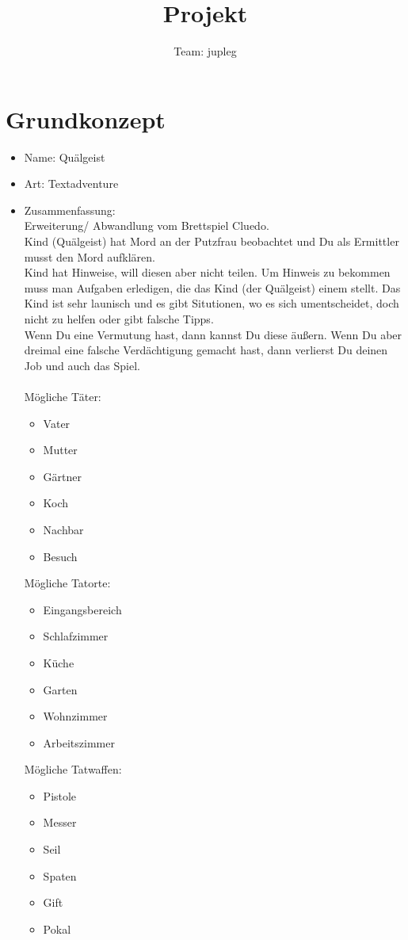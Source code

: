 \documentclass[10pt,a4paper]{article}
\title{Projekt}
\author{Team: jupleg}
\begin{document}
\maketitle
\newcommand{\thetitle} {Projekt}

\section*{Grundkonzept}
\begin{itemize}
\item Name: Quälgeist
\item Art: Textadventure
\item Zusammenfassung:\\
Erweiterung/ Abwandlung vom Brettspiel Cluedo.\\
Kind (Quälgeist) hat Mord an der Putzfrau beobachtet und Du als Ermittler musst den Mord aufklären.\\
Kind hat Hinweise, will diesen aber nicht teilen. Um Hinweis zu bekommen muss man Aufgaben erledigen, die das Kind (der Quälgeist) einem stellt. Das Kind ist sehr launisch und es gibt Situtionen, wo es sich umentscheidet, doch nicht zu helfen oder gibt falsche Tipps.\\
Wenn Du eine Vermutung hast, dann kannst Du diese äußern. 
Wenn Du aber dreimal eine falsche Verdächtigung gemacht hast, dann verlierst Du deinen Job und auch das Spiel.\\
\ \\
Mögliche Täter:
\begin{itemize}
\item Vater
\item Mutter
\item Gärtner
\item Koch
\item Nachbar
\item Besuch
\end{itemize}
Mögliche Tatorte:
\begin{itemize}
\item Eingangsbereich
\item Schlafzimmer
\item Küche
\item Garten
\item Wohnzimmer
\item Arbeitszimmer
\end{itemize}
Mögliche Tatwaffen:
\begin{itemize}
\item Pistole
\item Messer
\item Seil
\item Spaten
\item Gift
\item Pokal
\end{itemize}


\end{itemize}
\end{document}
